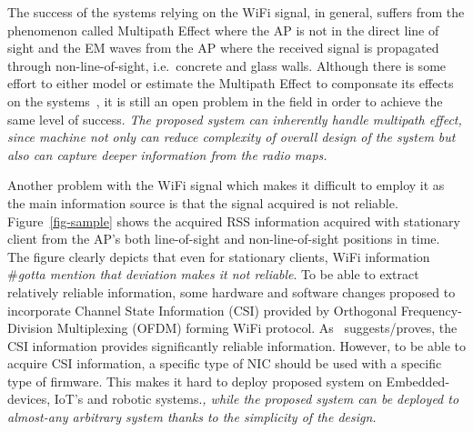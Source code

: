 \documentclass[letterpaper, 10 pt, conference]{ieeeconf}  %
\begin{document}
  The success of the systems relying on the WiFi signal, in general, suffers from the phenomenon called Multipath Effect where the AP is not in the direct line of sight and the EM waves from the AP where the received signal is propagated through non-line-of-sight, i.e.~concrete and glass walls.
  Although there is some effort to either model or estimate the Multipath Effect to componsate its effects on the systems~\cite{cai2015identification}, it is still an open problem in the field in order to achieve the same level of success.
  \textit{The proposed system can inherently handle multipath effect, since machine not only can reduce complexity of overall design of the system but also can capture deeper information from the radio maps.}

  Another problem with the WiFi signal which makes it difficult to employ it as the main information source is that the signal acquired is not reliable.
  Figure~\ref{fig-sample} shows the acquired RSS information acquired with stationary client from the AP's both line-of-sight and non-line-of-sight positions in time.
  The figure clearly depicts that even for stationary clients, WiFi information \#\textit{gotta mention that deviation makes it not reliable}.
  To be able to extract relatively reliable information, some hardware and software changes proposed to incorporate Channel State Information (CSI) provided by Orthogonal Frequency-Division Multiplexing (OFDM) forming WiFi protocol.
  As~\cite{gao2015channel} suggests/proves, the CSI information provides significantly reliable information.
  However, to be able to acquire CSI information, a specific type of NIC should be used with a specific type of firmware.
  This makes it hard to deploy proposed system on Embedded-devices, IoT's and robotic systems.\textit{, while the proposed system can be deployed to almost-any arbitrary system thanks to the simplicity of the design.}
\end{document}
